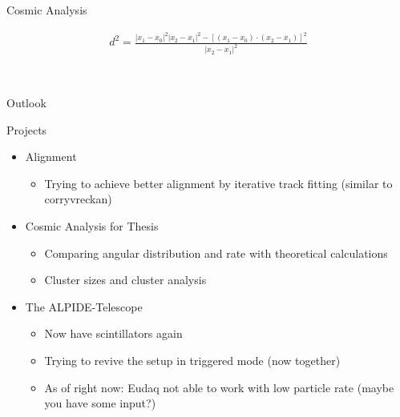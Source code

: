 \documentclass{beamer}
\begin{document}
\begin{frame}[fragile]{Cosmic Analysis}
\begin{minipage}{.4\textwidth}
\begin{figure}[H]
	\end{figure}
    \end{minipage}
    \begin{minipage}{.59\textwidth}
	\footnotesize
	\begin{align*}
	    d^2 = \frac{ \left| x_1-x_0 \right|^2 \left| x_2-x_1 \right|^2
		- \left[ \left( x_1-x_0 \right) \cdot \left( x_2-x_1 \right)
		\right]^2}{\left| x_2-x_1 \right|^2}
	\end{align*}
    \end{minipage}\\[5pt]
\end{frame}



\begin{frame}{Outlook}
    \begin{minipage}{.44\textwidth}
	\LARGE Projects \normalsize \\
	\begin{itemize}
	    \item Alignment \\[5pt]
		\begin{itemize} \tiny 
		    \item Trying to achieve better alignment by
			iterative track fitting (similar to corryvreckan)
		\end{itemize}
	    \item Cosmic Analysis for Thesis \\[5pt]
		\begin{itemize} \tiny 
		    \item Comparing angular distribution and rate with
			theoretical calculations
		    \item Cluster sizes and cluster analysis
		\end{itemize}
	    \item The ALPIDE-Telescope \\[5pt]
		\begin{itemize} \tiny 
		    \item Now have scintillators again
		    \item Trying to revive the setup in triggered mode
		       	(now together)
		    \item As of right now: Eudaq not able to work with low
			particle rate (maybe you have some input?)
		\end{itemize}
	\end{itemize}
    \end{minipage}
    \begin{minipage}{.55\textwidth}

\end{minipage}
\end{frame}
\end{document}
